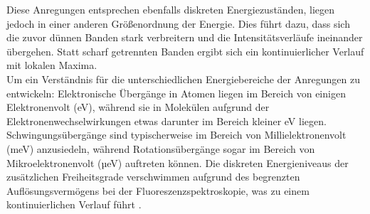 Diese Anregungen entsprechen ebenfalls diskreten Energiezuständen, liegen
jedoch in einer anderen Größenordnung der Energie.
Dies führt dazu, dass sich die zuvor dünnen Banden stark verbreitern
und die Intensitätsverläufe ineinander übergehen. Statt scharf getrennten Banden ergibt sich
ein kontinuierlicher Verlauf mit lokalen Maxima. \\
Um ein Verständnis für die unterschiedlichen Energiebereiche der Anregungen zu entwickeln:
Elektronische Übergänge in Atomen liegen im Bereich von einigen Elektronenvolt (eV),
während sie in Molekülen aufgrund der Elektronenwechselwirkungen
etwas darunter im Bereich kleiner eV liegen.
Schwingungsübergänge sind typischerweise im Bereich von Millielektronenvolt (meV) anzusiedeln,
während Rotationsübergänge sogar im Bereich von Mikroelektronenvolt (µeV) auftreten können.
Die diskreten Energieniveaus der zusätzlichen Freiheitsgrade verschwimmen
aufgrund des begrenzten Auflösungsvermögens bei der Fluoreszenzspektroskopie,
was zu einem kontinuierlichen Verlauf führt \cite{EPC, Prinzip, Parson, AMO}. \\
